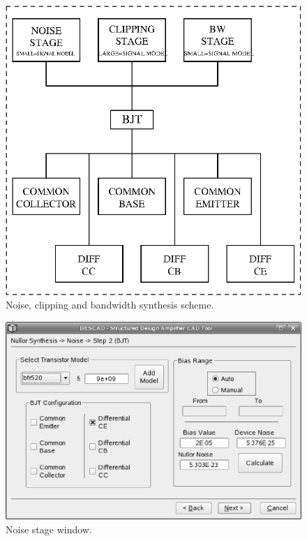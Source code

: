 \documentclass[twocolumn]{IEEEtran}
\begin{document}
\begin{figure}[hbtp]
	\centering
	\includegraphics[scale=0.5]{figures/descad2.eps}
	\caption{Noise, clipping and bandwidth synthesis scheme.}
	\label{fig:descad2}
\end{figure}

\begin{figure}[hbtp]
	\centering
	\includegraphics[scale=0.3]{figures/wizard3.eps}
	\caption{Noise stage window.}
	\label{fig:descad3}
\end{figure}
\end{document}

